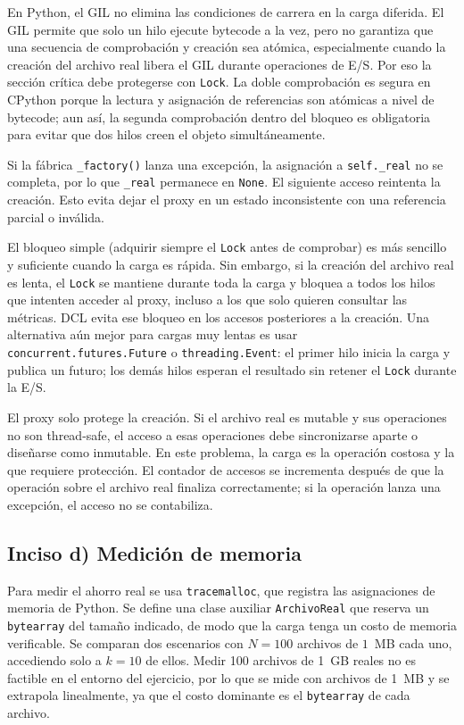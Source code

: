 En Python, el GIL no elimina las condiciones de carrera en la carga diferida. El GIL permite que solo un hilo ejecute bytecode a la vez, pero no garantiza que una secuencia de comprobación y creación sea atómica, especialmente cuando la creación del archivo real libera el GIL durante operaciones de E/S. Por eso la sección crítica debe protegerse con \texttt{Lock}. La doble comprobación es segura en CPython porque la lectura y asignación de referencias son atómicas a nivel de bytecode; aun así, la segunda comprobación dentro del bloqueo es obligatoria para evitar que dos hilos creen el objeto simultáneamente.

Si la fábrica \texttt{\_factory()} lanza una excepción, la asignación a \texttt{self.\_real} no se completa, por lo que \texttt{\_real} permanece en \texttt{None}. El siguiente acceso reintenta la creación. Esto evita dejar el proxy en un estado inconsistente con una referencia parcial o inválida.

El bloqueo simple (adquirir siempre el \texttt{Lock} antes de comprobar) es más sencillo y suficiente cuando la carga es rápida. Sin embargo, si la creación del archivo real es lenta, el \texttt{Lock} se mantiene durante toda la carga y bloquea a todos los hilos que intenten acceder al proxy, incluso a los que solo quieren consultar las métricas. DCL evita ese bloqueo en los accesos posteriores a la creación. Una alternativa aún mejor para cargas muy lentas es usar \texttt{concurrent.futures.Future} o \texttt{threading.Event}: el primer hilo inicia la carga y publica un futuro; los demás hilos esperan el resultado sin retener el \texttt{Lock} durante la E/S.

El proxy solo protege la creación. Si el archivo real es mutable y sus operaciones no son thread-safe, el acceso a esas operaciones debe sincronizarse aparte o diseñarse como inmutable. En este problema, la carga es la operación costosa y la que requiere protección. El contador de accesos se incrementa después de que la operación sobre el archivo real finaliza correctamente; si la operación lanza una excepción, el acceso no se contabiliza.

\subsection{Inciso d) Medición de memoria}

Para medir el ahorro real se usa \texttt{tracemalloc}, que registra las asignaciones de memoria de Python. Se define una clase auxiliar \texttt{ArchivoReal} que reserva un \texttt{bytearray} del tamaño indicado, de modo que la carga tenga un costo de memoria verificable. Se comparan dos escenarios con \(N=100\) archivos de \(1\)~MB cada uno, accediendo solo a \(k=10\) de ellos. Medir 100 archivos de 1~GB reales no es factible en el entorno del ejercicio, por lo que se mide con archivos de 1~MB y se extrapola linealmente, ya que el costo dominante es el \texttt{bytearray} de cada archivo.

